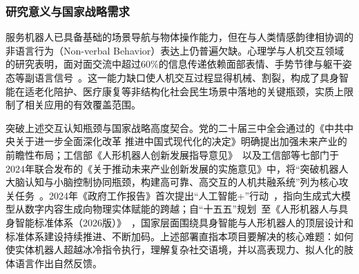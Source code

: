 






\subsubsection{研究意义与国家战略需求}

服务机器人已具备基础的场景导航与物体操作能力，但在与人类情感韵律相协调的非语言行为（Non-verbal Behavior）表达上仍普遍欠缺。心理学与人机交互领域的研究表明，面对面交流中超过60\%的信息传递依赖面部表情、手势节律与躯干姿态等副语言信号~\cite{mehrabian1971silent}。这一能力缺口使人机交互过程显得机械、割裂，构成了具身智能在适老化陪护、医疗康复等非结构化社会民生场景中落地的关键瓶颈，实质上限制了相关应用的有效覆盖范围。

突破上述交互认知瓶颈与国家战略高度契合。党的二十届三中全会通过的《中共中央关于进一步全面深化改革 推进中国式现代化的决定》明确提出加强未来产业的前瞻性布局；工信部《人形机器人创新发展指导意见》~\cite{MIIT2023}以及工信部等七部门于2024年联合发布的《关于推动未来产业创新发展的实施意见》中，将``突破机器人大脑认知与小脑控制协同瓶颈，构建高可靠、高交互的人机共融系统''列为核心攻关任务~\cite{MIIT2024Future}。2024年《政府工作报告》首次提出``人工智能+''行动~\cite{GovReport2024}，指向生成式大模型从数字内容生成向物理实体赋能的跨越；自``十五五”规划~\cite{Gov2025155}至《人形机器人与具身智能标准体系（2026版）》~\cite{humaoid2026}，国家层面围绕具身智能与人形机器人的顶层设计和标准体系建设持续推进、不断加码。上述部署直指本项目要解决的核心难题：如何使实体机器人超越冰冷指令执行，理解复杂社交语境，并以高表现力、拟人化的肢体语言作出自然反馈。

